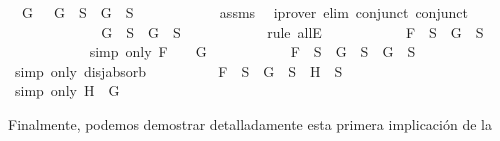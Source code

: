 \begin{isabellebody}
\ {\isachardoublequoteopen}{\isasymforall}\ G{\isachardot}\ \isactrlbold {\isasymnot}\ {\isacharparenleft}\isactrlbold {\isasymnot}\ G{\isacharparenright}\ {\isasymin}\ S\ {\isasymlongrightarrow}\ G\ {\isasymin}\ S{\isachardoublequoteclose}\isanewline
\ \ \ \ \ \ \ \ \ \ \isamarkupfalse%
\ assms\ \isamarkupfalse%
\ {\isacharparenleft}iprover\ elim{\isacharcolon}\ conjunct{}\ conjunct{}{\isacharparenright}\isanewline
\ \ \ \ \ \ \ \ \isamarkupfalse%
\ \isamarkupfalse%
\ {\isachardoublequoteopen}\isactrlbold {\isasymnot}\ {\isacharparenleft}\isactrlbold {\isasymnot}\ G{\isacharparenright}\ {\isasymin}\ S\ {\isasymlongrightarrow}\ G\ {\isasymin}\ S{\isachardoublequoteclose}\isanewline
\ \ \ \ \ \ \ \ \ \ \isamarkupfalse%
\ {\isacharparenleft}rule\ allE{\isacharparenright}\isanewline
\ \ \ \ \ \ \ \ \isamarkupfalse%
\ \isamarkupfalse%
\ {\isachardoublequoteopen}F\ {\isasymin}\ S\ {\isasymlongrightarrow}\ G\ {\isasymin}\ S{\isachardoublequoteclose}\isanewline
\ \ \ \ \ \ \ \ \ \ \isamarkupfalse%
\ {\isacharparenleft}simp\ only{\isacharcolon}\ {\isacartoucheopen}F\ {\isacharequal}\ \isactrlbold {\isasymnot}\ {\isacharparenleft}\isactrlbold {\isasymnot}\ G{\isacharparenright}{\isacartoucheclose}{\isacharparenright}\isanewline
\ \ \ \ \ \ \ \ \isamarkupfalse%
\ \isamarkupfalse%
\ {\isachardoublequoteopen}F\ {\isasymin}\ S\ {\isasymlongrightarrow}\ G\ {\isasymin}\ S\ {\isasymor}\ G\ {\isasymin}\ S{\isachardoublequoteclose}\isanewline
\ \ \ \ \ \ \ \ \ \ \isamarkupfalse%
\ {\isacharparenleft}simp\ only{\isacharcolon}\ disj{\isacharunderscore}absorb{\isacharparenright}\isanewline
\ \ \ \ \ \ \ \ \isamarkupfalse%
\ {\isachardoublequoteopen}F\ {\isasymin}\ S\ {\isasymlongrightarrow}\ G\ {\isasymin}\ S\ {\isasymor}\ H\ {\isasymin}\ S{\isachardoublequoteclose}\isanewline
\ \ \ \ \ \ \ \ \isamarkupfalse%
\ {\isacharparenleft}simp\ only{\isacharcolon}\ {\isacartoucheopen}H\ {\isacharequal}\ G{\isacartoucheclose}{\isacharparenright}\isanewline
\ \ \ \ \ \ \isamarkupfalse%
\isanewline
\ \ \ \ \isamarkupfalse%
\isanewline
\ \ \isamarkupfalse%
\isanewline
{}\isamarkupfalse%
%
\endisatagproof
{\isafoldproof}%
%
\isadelimproof
%
\endisadelimproof
%
\begin{isamarkuptext}%
Finalmente, podemos demostrar detalladamente esta primera implicación de la

\end{isamarkuptext}
\end{isabellebody}
